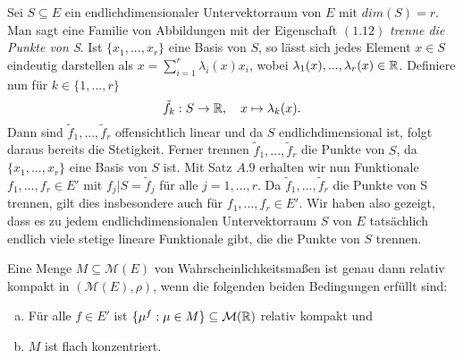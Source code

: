 \begin{remark}%
    Sei $S \subseteq E$ ein endlichdimensionaler Untervektorraum von $E$ mit $dim(S) = r$. 
    Man sagt eine Familie von Abbildungen mit der Eigenschaft $(1.12)$ \textit{trenne die Punkte von S}. 
    Ist $\{x_1,...,x_r\}$ eine Basis von $S$, so lässt sich jedes Element $x \in S$ eindeutig darstellen als $x = \sum_{i=1}^r \lambda_i(x) x_i$, wobei $\lambda_1(x),...,\lambda_r(x) \in \mathbb{R}$.
    Definiere nun für $k \in \{1,...,r\}$
    $$
        \tilde{f}_k: S \to \mathbb{R}, \quad x \mapsto \lambda_k(x).
    $$
    Dann sind $\tilde{f}_1,...,\tilde{f}_r$ offensichtlich linear und da $S$ endlichdimensional ist, folgt daraus bereits die Stetigkeit. 
    Ferner trennen $\tilde{f}_1,...,\tilde{f}_r$ die Punkte von $S$, da $\{x_1,...,x_r\}$ eine Basis von $S$ ist. Mit Satz $A.9$ erhalten wir nun Funktionale $f_1,...,f_r \in E'$ mit 
    $f_j|S = \tilde{f}_j$ für alle $j =1,...,r$. Da $\tilde{f}_1,...,\tilde{f}_r$ die Punkte von S trennen, gilt dies insbesondere auch für $f_1,...,f_r \in E'$. 
    Wir haben also gezeigt, dass es zu jedem endlichdimensionalen Untervektorraum $S$ von $E$ tatsächlich endlich viele stetige lineare Funktionale gibt, die die Punkte von $S$ trennen. 
\end{remark}

\begin{theorem}
    Eine Menge $M \subseteq \mathcal{M}(E)$ von Wahrscheinlichkeitsmaßen ist genau dann relativ kompakt in $(\mathcal{M}(E), \rho)$, wenn die folgenden beiden Bedingungen erfüllt sind:
    \begin{enumerate}[(a)]
        \item Für alle $f \in E'$ ist $\{\mu^f : \mu \in M\} \subseteq \mathcal{M}(\mathbb{R})$ relativ kompakt und
        \item $M$ ist flach konzentriert. 
    \end{enumerate}
\end{theorem}

